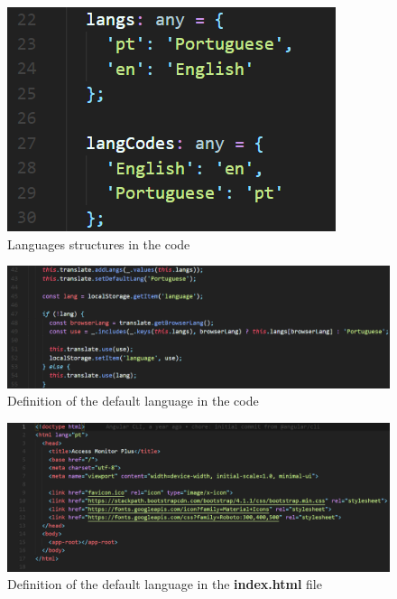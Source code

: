 \begin{figure}[ht]
    \centering
    \includegraphics{lib/images/translate/code_lang_strcuture.png}
    \caption{Languages structures in the code}
    \label{fig:code_lang_structures}
\end{figure}

\begin{figure}[ht]
    \centering
    \includegraphics[width=\linewidth]{lib/images/translate/code_default_lang.png}
    \caption{Definition of the default language in the code}
    \label{fig:code_default_lang}
\end{figure}

\begin{figure}[ht]
    \centering
    \includegraphics[width=\linewidth]{lib/images/translate/index_html_lang.png}
    \caption{Definition of the default language in the \textbf{index.html} file}
    \label{fig:html_code_default_lang}
\end{figure}